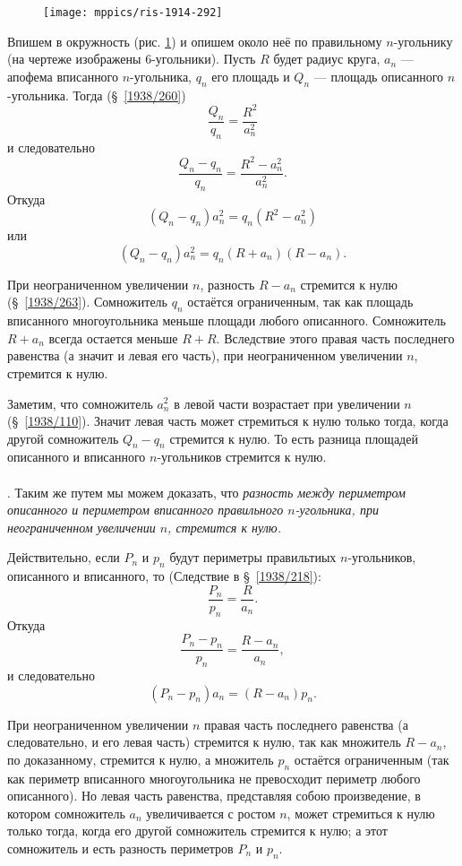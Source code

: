 \documentclass[twoside]{book}
\begin{document}
\begin{figure}
\centering
\texttt{[image: mppics/ris-1914-292]}
\caption{}\label{1914/ris-292}
\end{figure}

Впишем в окружность (рис. \ref{1914/ris-292}) и опишем около неё по правильному $n$-угольнику (на чертеже изображены $6$-угольники).
Пусть $R$ будет радиус круга, $a_n$ — апофема вписанного $n$-угольника, $q_n$ его площадь и $Q_n$ — площадь описанного $n$-угольника.
Тогда (§~\ref{1938/260})
\[\frac {Q_n}{q_n}=\frac{R^2}{a_n^2}\]
и следовательно 
\[\frac {Q_n-q_n}{q_n}=\frac{R^2-a_n^2}{a_n^2}.\]
Откуда
\[(Q_n-q_n)a_n^2=q_n(R^2-a_n^2)\]
или
\[(Q_n-q_n)a_n^2=q_n(R+a_n)(R-a_n).\]

При неограниченном увеличении $n$, разность $R-a_n$ стремится к нулю (§~\ref{1938/263}).
Сомножитель $q_n$ остаётся ограниченным, так как площадь вписанного многоугольника меньше площади любого описанного.  
Сомножитель $R+a_n$ всегда остается меньше $R+R$.
Вследствие этого правая часть последнего равенства (а значит и левая его часть),
при неограниченном увеличении $n$, стремится к нулю.

Заметим, что сомножитель $a_n^2$ в левой части возрастает при увеличении $n$ (§~\ref{1938/110}).
Значит левая часть может стремиться к нулю только тогда, когда другой сомножитель $Q_n-q_n$ стремится к нулю.
То есть разница площадей описанного и вписанного $n$-угольников стремится к нулю.

\paragraph{}\label{1914/231}
.
Таким же путем мы можем доказать, что \emph{разность между периметром описанного и
периметром вписанного правильного $n$-угольника, при неограниченном увеличении $n$, стремится к нулю.}

Действительно, если $P_n$ и $p_n$ будут периметры правильтиых $n$-угольников, описанного и вписанного, то (Следствие в §~\ref{1938/218}):
\[\frac {P_n}{p_n}=\frac R{a_n}.\]
Откуда
\[\frac{P_n-p_n}{p_n}=\frac{R-a_n}{a_n},\]
и следовательно
\[(P_n-p_n)a_n=(R-a_n)p_n.\]

При неограниченном увеличении $n$ правая часть последнего равенства (а следовательно, и его левая часть) стремится к нулю, так как множитель $R-a_n$, по доказанному, стремится к нулю, а множитель $p_n$ остаётся ограниченным (так как периметр вписанного многоугольника не превосходит периметр любого описанного).
Но левая часть равенства, представляя собою произведение, в котором сомножитель $a_n$ увеличивается с ростом $n$, может стремиться к нулю только тогда, когда его другой сомножитель  стремится к нулю;
а этот сомножитель и есть разность периметров $P_n$ и $p_n$.
\end{document}

